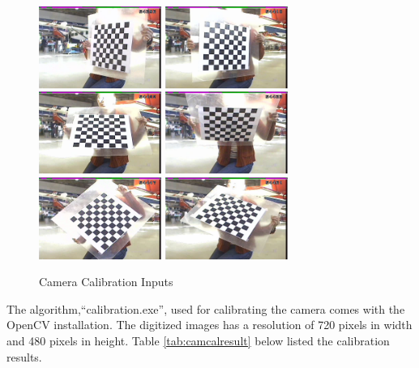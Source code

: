 \begin{figure}
  \centering
  \includegraphics[width=4cm,keepaspectratio=true]{./Figures/camcal/camcal1_130.jpeg}
  \includegraphics[width=4cm,keepaspectratio=true]{./Figures/camcal/camcal1_140.jpeg}
  \includegraphics[width=4cm,keepaspectratio=true]{./Figures/camcal/camcal1_160.jpeg}
  \includegraphics[width=4cm,keepaspectratio=true]{./Figures/camcal/camcal1_180.jpeg}
  \includegraphics[width=4cm,keepaspectratio=true]{./Figures/camcal/camcal1_210.jpeg}
  \includegraphics[width=4cm,keepaspectratio=true]{./Figures/camcal/camcal1_240.jpeg}
  \caption{Camera Calibration Inputs}
  \label{fig:camcal}
\end{figure}

The algorithm,``calibration.exe'', used for calibrating the camera
comes with the OpenCV installation. The digitized images has a
resolution of 720 pixels in width and 480 pixels in height. Table
\ref{tab:camcalresult} below listed the calibration results.

